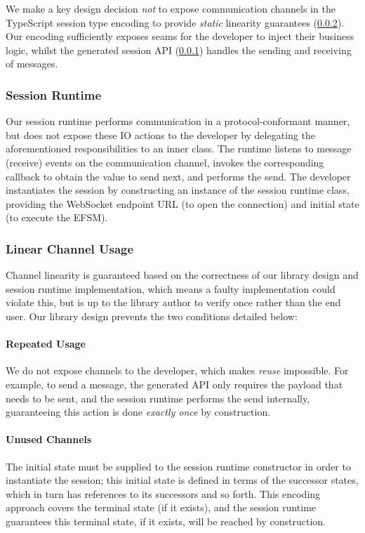 We make a key design decision \textit{not} to expose communication channels in
the TypeScript session type encoding to provide \textit{static} linearity
guarantees (\cref{section:serverlinear}).
Our encoding sufficiently exposes seams for the developer to inject their
business logic, whilst the generated session API
(\cref{section:serversessionapi}) handles the sending and receiving of
messages.

\subsubsection{Session Runtime}
\label{section:serversessionapi}

Our session runtime performs communication in a protocol-conformant manner, but
does not expose these IO actions to the developer by delegating the
aforementioned responsibilities to an inner class.
The runtime listens to message (receive) events on the communication channel,
invokes the corresponding callback to obtain the value to send next, and
performs the send.
The developer instantiates the session by constructing an instance of the
session runtime class, providing the WebSocket endpoint URL (to open the
connection) and initial state (to execute the EFSM).

\subsubsection{Linear Channel Usage}
\label{section:serverlinear}
Channel linearity is guaranteed based on the correctness of our library design
and session runtime implementation, which means a faulty implementation could
violate this, but is up to the library author to verify once rather than the
end user. Our library design prevents the two conditions detailed below:

\paragraph{Repeated Usage}
We do not expose channels to the developer, which makes \textit{reuse}
impossible.
For example, to send a message, the generated API only requires the payload
that needs to be sent, and the session runtime performs the send internally,
guaranteeing this action is done \textit{exactly once} by construction.

\paragraph{Unused Channels}
The initial state must be supplied to the session runtime
constructor in order to instantiate the session;
this initial state is defined
in terms of the successor states, which in turn has references to its
successors and so forth.
This encoding approach covers the terminal state (if it exists), and the
session runtime guarantees this terminal state, if it exists, will be reached
by construction.

